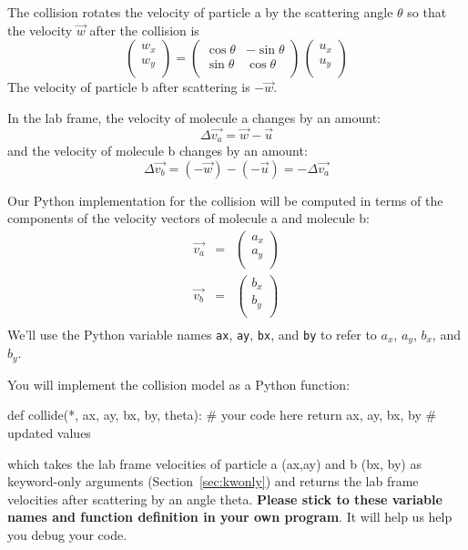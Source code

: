 \documentclass[12pt]{article}
\begin{document}
The collision rotates the velocity of particle a by the scattering
angle $\theta$ so that the velocity $\vec{w}$ after the collision is
\begin{displaymath}
\begin{pmatrix}
w_x \\
w_y \\
\end{pmatrix}
  =
\begin{pmatrix}
\cos \theta  & -\sin \theta \\
\sin \theta  & \cos \theta \\
\end{pmatrix}
\,
\begin{pmatrix}
u_x \\
u_y \\
\end{pmatrix}
\end{displaymath}
The velocity of particle b after scattering is $-\vec{w}$.

In the lab frame, the velocity of molecule a changes by an amount:
\begin{displaymath}
\Delta \vec{v_a} = \vec{w} - \vec{u}  
\end{displaymath}
and the velocity of molecule b changes by an amount:
\begin{displaymath}
\Delta \vec{v_b} = (-\vec{w}) - (-\vec{u}) = -\Delta \vec{v_a}
\end{displaymath}

Our Python implementation for the collision will be computed in terms
of the components of the velocity vectors of molecule a and molecule
b:
\begin{eqnarray*}
\vec{v_a} &=& 
\begin{pmatrix}
a_x \\
a_y \\
\end{pmatrix} \\
\vec{v_b} &=& 
\begin{pmatrix}
b_x \\
b_y \\
\end{pmatrix} \\
\end{eqnarray*}
We'll use the Python variable names {\tt ax}, {\tt ay}, {\tt bx}, and
{\tt by} to refer to $a_x$, $a_y$, $b_x$, and $b_y$.

You will implement the collision model as a Python function:
\begin{python}
def collide(*, ax, ay, bx, by, theta):
    # your code here
    return ax, ay, bx, by # updated values
\end{python}
which takes the lab frame velocities of particle a (ax,ay) and b (bx,
by) as keyword-only arguments (Section~\ref{sec:kwonly}) and returns the lab frame velocities after
scattering by an angle theta.  {\bf Please stick to these variable names and function
  definition in your own program}.  It will help us help you debug
your code.
\end{document}
